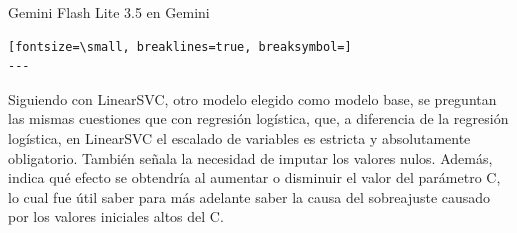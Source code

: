 \documentclass[12pt,a4paper,oneside]{book}
\begin{document}
\begin{iaresp}{Gemini Flash Lite 3.5 en Gemini}
\begin{Verbatim}[fontsize=\small, breaklines=true, breaksymbol=]
---
\end{Verbatim}
\end{iaresp}
\begin{iaanalisis}
Siguiendo con LinearSVC, otro modelo elegido como modelo base, se preguntan las mismas cuestiones que con regresión logística, que, a diferencia de la regresión logística, en LinearSVC el escalado de variables es estricta y absolutamente obligatorio. También señala la necesidad de imputar los valores nulos. Además, indica qué efecto se obtendría al aumentar o disminuir el valor del parámetro C, lo cual fue útil saber para más adelante saber la causa del sobreajuste causado por los valores iniciales altos del C.
\end{iaanalisis}
\end{document}
